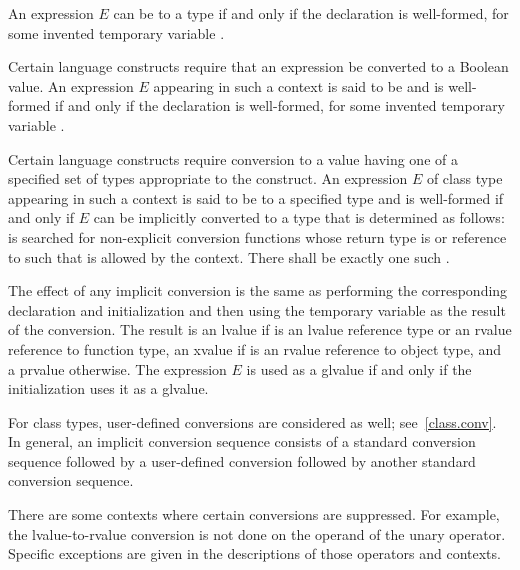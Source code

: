 \pnum
An expression $E$ can be
 to a type  if and only if the
declaration  is well-formed, for some invented temporary
variable .

\pnum
Certain language constructs require that an expression be converted to a Boolean
value. An expression $E$ appearing in such a context is said to be
 and is well-formed if and only if
the declaration  is well-formed, for some invented temporary
variable .

\pnum
Certain language constructs require conversion to a value having
one of a specified set of types appropriate to the construct. An
expression $E$ of class type  appearing in such a
context is said to be
%
 to a specified type  and is
well-formed if and only if $E$ can be implicitly converted to a type 
that is determined as follows:
 is searched for non-explicit conversion functions
whose return type is \cv{}  or reference to \cv{}
 such that  is allowed by the context.
There shall be exactly one such .

\pnum
The effect of any implicit
conversion is the same as performing the corresponding declaration and initialization
and then using the temporary variable as the result of the conversion.
The result is an lvalue if  is an lvalue reference
type or an rvalue reference to function type,
an xvalue if  is an rvalue reference to object type,
and a prvalue otherwise. The expression $E$
is used as a glvalue if and only if the initialization uses it as a glvalue.

\pnum
\begin{note}
For class types, user-defined conversions are considered as well;
see~\ref{class.conv}. In general, an implicit conversion
sequence consists of a standard conversion
sequence followed by a user-defined conversion followed by another
standard conversion sequence.
\end{note}

\pnum
\begin{note}
There are some contexts where certain conversions are suppressed. For
example, the lvalue-to-rvalue conversion is not done on the operand of
the unary \tcode{\&} operator. Specific exceptions are given in the
descriptions of those operators and contexts.
\end{note}

